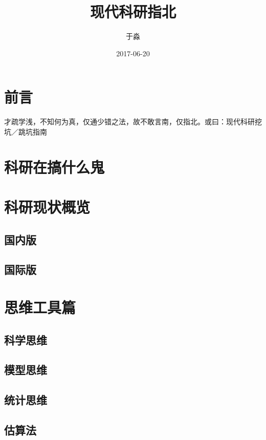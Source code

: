 \documentclass[]{book}
\title{现代科研指北}
\author{于淼}
\date{2017-06-20}
\begin{document}
\maketitle

{
\setcounter{tocdepth}{1}
\tableofcontents
}
\chapter{前言}

才疏学浅，不知何为真，仅通少错之法，故不敢言南，仅指北。或曰：现代科研挖坑／跳坑指南

\chapter{科研在搞什么鬼}\label{intro}

\chapter{科研现状概览}\label{view}

\section{国内版}

\section{国际版}

\chapter{思维工具篇}

\section{科学思维}

\section{模型思维}

\section{统计思维}

\section{估算法}
\end{document}
